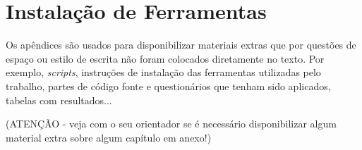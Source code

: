 \chapter{Instalação de Ferramentas}
\label{ape:instalacao:ferramentas}

Os apêndices são usados para disponibilizar materiais extras que por questões de espaço ou estilo de escrita não foram colocados diretamente no texto. Por exemplo, \textit{scripts}, instruções de instalação das ferramentas utilizadas pelo trabalho, partes de código fonte e questionários que tenham sido aplicados, tabelas com resultados...

(ATENÇÃO - veja com o seu orientador se é necessário disponibilizar algum material extra sobre algum capítulo em anexo!)

